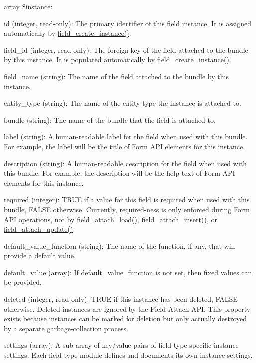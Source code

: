 array \$instance:
\begin{DoxyItemize}
\item id (integer, read-\/only): The primary identifier of this field instance. It is assigned automatically by \hyperlink{group__field__crud_ga3a1e23613d572a6e908e063c3a0335f8}{field\_\-create\_\-instance()}.
\item field\_\-id (integer, read-\/only): The foreign key of the field attached to the bundle by this instance. It is populated automatically by \hyperlink{group__field__crud_ga3a1e23613d572a6e908e063c3a0335f8}{field\_\-create\_\-instance()}.
\item field\_\-name (string): The name of the field attached to the bundle by this instance.
\item entity\_\-type (string): The name of the entity type the instance is attached to.
\item bundle (string): The name of the bundle that the field is attached to.
\item label (string): A human-\/readable label for the field when used with this bundle. For example, the label will be the title of Form API elements for this instance.
\item description (string): A human-\/readable description for the field when used with this bundle. For example, the description will be the help text of Form API elements for this instance.
\item required (integer): TRUE if a value for this field is required when used with this bundle, FALSE otherwise. Currently, required-\/ness is only enforced during Form API operations, not by \hyperlink{group__field__attach_ga1e92543395961c912eb293b50e991586}{field\_\-attach\_\-load()}, \hyperlink{group__field__attach_gad7c37d577b97db5e0c182bc570ed7cf4}{field\_\-attach\_\-insert()}, or \hyperlink{group__field__attach_ga8d15efdca36306ea04552bed4986e77b}{field\_\-attach\_\-update()}.
\item default\_\-value\_\-function (string): The name of the function, if any, that will provide a default value.
\item default\_\-value (array): If default\_\-value\_\-function is not set, then fixed values can be provided.
\item deleted (integer, read-\/only): TRUE if this instance has been deleted, FALSE otherwise. Deleted instances are ignored by the Field Attach API. This property exists because instances can be marked for deletion but only actually destroyed by a separate garbage-\/collection process.
\item settings (array): A sub-\/array of key/value pairs of field-\/type-\/specific instance settings. Each field type module defines and documents its own instance settings.

\end{DoxyItemize}
